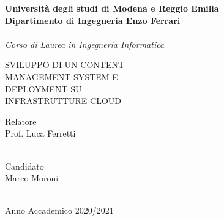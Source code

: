 \documentclass[12pt,a4paper]{article}
\begin{document}
\begin{titlepage}
    \begin{center}
    {
        \large
        \textbf{Università  degli studi di Modena e Reggio Emilia} \\
        \textbf{Dipartimento di Ingegneria Enzo Ferrari} \\
        \hspace*{0cm} \hrulefill \hspace*{0cm} \\
        \emph{Corso di Laurea in Ingegneria Informatica}


        \huge{\uppercase{
        Sviluppo di un Content\\
        Management System e\\
        Deployment su\\
        Infrastrutture Cloud\\}}}
        \vspace{5mm}


    \end{center}
    \vspace{40mm}
    \par
    \noindent
    \begin{minipage}[t]{0.47\textwidth}
        {\large{ Relatore\\
        Prof.
        Luca Ferretti}}\\
        \\
    \end{minipage}
    \hfill
    \begin{minipage}[t]{0.47\textwidth}\raggedleft
        {\large{ Candidato\\
        Marco Moroni}}
    \end{minipage}
    \vspace{20mm}
    \begin{center}
        \hspace*{0cm} \hrulefill \hspace*{0cm} \\
        {\large{
        Anno Accademico 2020/2021}}
    \end{center}

\end{titlepage}
\end{document}
